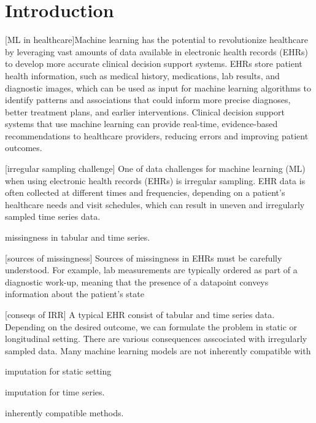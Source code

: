 \documentclass[journal,twoside,web]{ieeecolor}
\begin{document}
\section{Introduction}
\label{sec:intro}

[ML in healthcare]Machine learning has the potential to revolutionize healthcare by leveraging vast amounts of data available in electronic health records (EHRs) to develop more accurate clinical decision support systems. EHRs store patient health information, such as medical history, medications, lab results, and diagnostic images, which can be used as input for machine learning algorithms to identify patterns and associations that could inform more precise diagnoses, better treatment plans, and earlier interventions. Clinical decision support systems that use machine learning can provide real-time, evidence-based recommendations to healthcare providers, reducing errors and improving patient outcomes.

[irregular sampling challenge] One of data challenges for machine learning (ML) when using electronic health records (EHRs) is irregular sampling. EHR data is often collected at different times and frequencies, depending on a patient's healthcare needs and visit schedules, which can result in uneven and irregularly sampled time series data. 

missingness in tabular and time series.

[sources of missingness] Sources of missingness in EHRs must be carefully understood. For example, lab measurements are typically ordered as part of a diagnostic work-up, meaning that the presence of a datapoint conveys information about the patient's state

[conseqs of IRR] A typical EHR consist of tabular and time series data. Depending on the desired outcome, we can formulate the problem in static or longitudinal setting. There are various consequences asscociated with irregularly sampled data. Many machine learning models are not inherently compatible with

imputation for static setting

imputation for time series.

inherently compatible methods.
\end{document}
